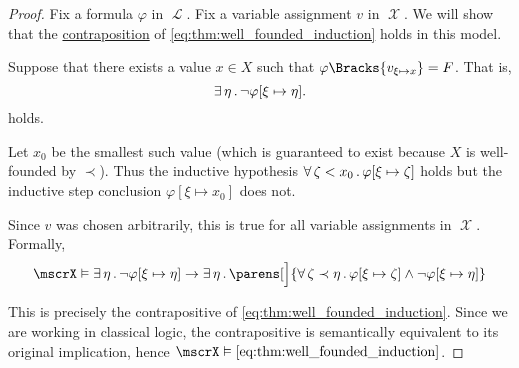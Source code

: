 \begin{proof}
  Fix a formula \( \varphi \) in \( \mscrL \). Fix a variable assignment \( v \) in \( \mscrX \). We will show that the \hyperref[def:material_implication/contrapositive]{contraposition} of \eqref{eq:thm:well_founded_induction} holds in this model.

  Suppose that there exists a value \( x \in X \) such that \( \varphi\Bracks{v_{\xi \mapsto x}} = F \). That is,
  \begin{equation*}
    \exists \thinspace \eta \thinspace . \thinspace \neg \varphi[\xi \mapsto \eta].
  \end{equation*}
  holds.

  Let \( x_0 \) be the smallest such value (which is guaranteed to exist because \( X \) is well-founded by \( \prec \)). Thus the inductive hypothesis \( \forall \thinspace \zeta < x_0 \thinspace . \thinspace \varphi[\xi \mapsto \zeta] \) holds but the inductive step conclusion \( \varphi[\xi \mapsto x_0] \) does not.

  Since \( v \) was chosen arbitrarily, this is true for all variable assignments in \( \mscrX \). Formally,
  \begin{equation}\label{eq:thm:well_founded_induction/contraposition}
    \mscrX
    \vDash
    \qexists \eta \neg \varphi[\xi \mapsto \eta]
    \rightarrow
    \qexists \eta \parens[\Big]
      {
        \qforall {\zeta \prec \eta} \varphi[\xi \mapsto \zeta] \wedge \neg \varphi[\xi \mapsto \eta]
      }
  \end{equation}

  This is precisely the contrapositive of \eqref{eq:thm:well_founded_induction}. Since we are working in classical logic, the contrapositive is semantically equivalent to its original implication, hence \( \mscrX \vDash \eqref{eq:thm:well_founded_induction} \).
\end{proof}

